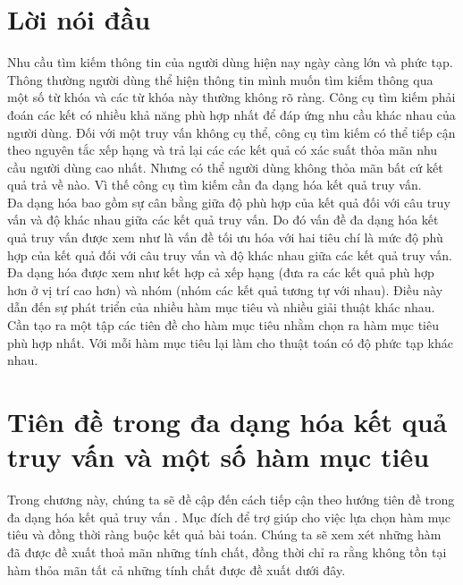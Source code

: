 \documentclass[12pt]{report}
\begin{document}
\newpage
\setcounter{page}{1}

\section*{Lời nói đầu}

Nhu cầu tìm kiếm thông tin của người dùng hiện nay ngày càng lớn và phức tạp. Thông thường người dùng thể hiện thông tin mình muốn tìm kiếm thông qua một số từ khóa và các từ khóa này thường không rõ ràng. Công cụ tìm kiếm phải đoán các kết có nhiều khả năng phù hợp nhất để đáp ứng nhu cầu khác nhau của người dùng. Đối với một truy vấn không cụ thể, công cụ tìm kiếm có thể tiếp cận theo nguyên tắc xếp hạng và trả lại các các kết quả có xác suất thỏa mãn nhu cầu người dùng cao nhất. Nhưng có thể người dùng không thỏa mãn bất cứ kết quả trả về nào. Vì thế 	công cụ tìm kiếm cần đa dạng hóa kết quả truy vấn.\\
Đa dạng hóa bao gồm sự cân bằng giữa độ phù hợp của kết quả đối với câu truy vấn và độ khác nhau giữa các kết quả truy vấn. Do đó vấn đề đa dạng hóa kết quả truy vấn được xem như là vấn đề tối ưu hóa với hai tiêu chí là mức độ phù hợp của kết quả đối với câu truy vấn và độ khác nhau giữa các kết quả truy vấn. Đa dạng hóa được xem như kết hợp cả xếp hạng (đưa ra các kết quả phù hợp hơn ở vị trí cao hơn) và nhóm (nhóm các kết quả tương tự với nhau). Điều này dẫn đến sự phát triển của nhiều hàm mục tiêu và nhiều giải thuật khác nhau.
Cần tạo ra một tập các tiên đề cho hàm mục tiêu nhằm chọn ra hàm mục tiêu phù hợp nhất. Với mỗi hàm mục tiêu lại làm cho thuật toán có độ phức tạp khác nhau.

\newpage

\section{Tiên đề trong đa dạng hóa kết quả truy vấn và một số hàm mục tiêu}
Trong chương này, chúng ta sẽ đề cập đến cách tiếp cận 
theo hướng tiên đề trong đa dạng hóa kết quả truy vấn \cite{axiom-paper}. 
Mục đích để trợ giúp cho việc lựa chọn hàm mục tiêu và đồng thời 
ràng buộc kết quả bài toán.
Chúng ta sẽ xem xét những hàm đã được đề xuất thoả mãn những tính chất, đồng thời chỉ ra rằng không tồn tại hàm thỏa mãn tất cả những tính chất được đề xuất dưới đây. 
\end{document}
